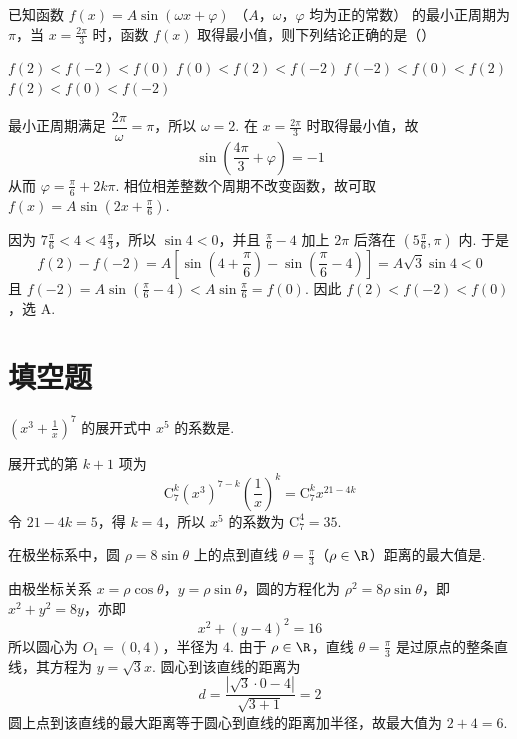 \begin{problem}
已知函数 \( f(x) = A \sin (\omega x + \varphi) \) （\(A\)，\(\omega\)，\(\varphi\) 均为正的常数） 的最小正周期为 \( \pi \)，当 \( x = \frac{2\pi}{3} \) 时，函数 \( f(x) \) 取得最小值，则下列结论正确的是（\quad）

\choices
    {\(f(2) < f(-2) < f(0)\)}
    {\(f(0) < f(2) < f(-2)\)}
    {\(f(-2) < f(0) < f(2)\)}
    {\(f(2) < f(0) < f(-2)\)}

\begin{solution}
最小正周期满足 \(\dfrac{2\pi}{\omega}=\pi\)，所以 \(\omega=2\). 在 \(x=\frac{2\pi}{3}\) 时取得最小值，故
\[
\sin\left(\frac{4\pi}{3}+\varphi\right)=-1
\]
从而 \(\varphi=\frac{\pi}{6}+2k\pi\). 相位相差整数个周期不改变函数，故可取
\(f(x)=A\sin\left(2x+\frac{\pi}{6}\right)\).

因为 \(7\frac{\pi}{6}<4<4\frac{\pi}{3}\)，所以 \(\sin4<0\)，并且
\(\frac{\pi}{6}-4\) 加上 \(2\pi\) 后落在 \((5\frac{\pi}{6},\pi)\) 内. 于是
\[
f(2)-f(-2)=A\left[\sin\left(4+\frac{\pi}{6}\right)-\sin\left(\frac{\pi}{6}-4\right)\right]=A\sqrt{3}\sin4<0
\]
且 \(f(-2)=A\sin(\frac{\pi}{6}-4)<A\sin\frac{\pi}{6}=f(0)\). 因此
\(f(2)<f(-2)<f(0)\)，选 A.
\end{solution}
\end{problem}

\section{填空题}

\begin{problem}
\(\left(x^{3} + \frac{1}{x}\right)^{7}\) 的展开式中 \(x^{5}\) 的系数是\fillinblank{}.

\begin{solution}
展开式的第 \(k+1\) 项为
\[
\mathrm C_7^k(x^3)^{7-k}\left(\frac1x\right)^k=\mathrm C_7^k x^{21-4k}
\]
令 \(21-4k=5\)，得 \(k=4\)，所以 \(x^5\) 的系数为
\(\mathrm C_7^4=35\).
\end{solution}
\end{problem}

\begin{problem}
在极坐标系中，圆 \(\rho = 8\sin \theta\) 上的点到直线 \(\theta = \frac{\pi}{3}\)（\(\rho \in \R\)）距离的最大值是\fillinblank{}.

\begin{solution}
由极坐标关系 \(x=\rho\cos\theta\)，\(y=\rho\sin\theta\)，圆的方程化为 \(\rho^2=8\rho\sin\theta\)，即 \(x^2+y^2=8y\)，亦即
\[
x^2+(y-4)^2=16
\]
所以圆心为 \(O_1=(0,4)\)，半径为 \(4\). 由于 \(\rho\in\R\)，直线 \(\theta=\frac\pi3\) 是过原点的整条直线，其方程为 \(y=\sqrt3x\). 圆心到该直线的距离为
\[
d=\frac{|\sqrt3\cdot0-4|}{\sqrt{3+1}}=2
\]
圆上点到该直线的最大距离等于圆心到直线的距离加半径，故最大值为 \(2+4=6\).
\end{solution}
\end{problem}

